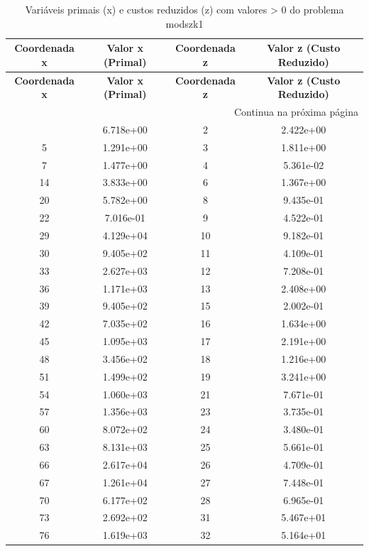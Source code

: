\documentclass[12pt]{article}
\begin{document}
\begin{longtable}{@{}cccc@{}}
\caption{Variáveis primais (x) e custos reduzidos (z) com valores > 0 do problema modszk1} \\
\toprule
\textbf{Coordenada x} & \textbf{Valor x (Primal)} & \textbf{Coordenada z} & \textbf{Valor z (Custo Reduzido)} \\
\midrule
\endfirsthead

\toprule
\textbf{Coordenada x} & \textbf{Valor x (Primal)} & \textbf{Coordenada z} & \textbf{Valor z (Custo Reduzido)} \\
\midrule
\endhead

\midrule \multicolumn{4}{r}{{Continua na próxima página}} \\ \midrule
\endfoot

\bottomrule
\endlastfoot
1 & 6.718e+00 & 2 & 2.422e+00 \\
5 & 1.291e+00 & 3 & 1.811e+00 \\
7 & 1.477e+00 & 4 & 5.361e-02 \\
14 & 3.833e+00 & 6 & 1.367e+00 \\
20 & 5.782e+00 & 8 & 9.435e-01 \\
22 & 7.016e-01 & 9 & 4.522e-01 \\
29 & 4.129e+04 & 10 & 9.182e-01 \\
30 & 9.405e+02 & 11 & 4.109e-01 \\
33 & 2.627e+03 & 12 & 7.208e-01 \\
36 & 1.171e+03 & 13 & 2.408e+00 \\
39 & 9.405e+02 & 15 & 2.002e-01 \\
42 & 7.035e+02 & 16 & 1.634e+00 \\
45 & 1.095e+03 & 17 & 2.191e+00 \\
48 & 3.456e+02 & 18 & 1.216e+00 \\
51 & 1.499e+02 & 19 & 3.241e+00 \\
54 & 1.060e+03 & 21 & 7.671e-01 \\
57 & 1.356e+03 & 23 & 3.735e-01 \\
60 & 8.072e+02 & 24 & 3.480e-01 \\
63 & 8.131e+03 & 25 & 5.661e-01 \\
66 & 2.617e+04 & 26 & 4.709e-01 \\
67 & 1.261e+04 & 27 & 7.448e-01 \\
70 & 6.177e+02 & 28 & 6.965e-01 \\
73 & 2.692e+02 & 31 & 5.467e+01 \\
76 & 1.619e+03 & 32 & 5.164e+01 \\

\end{longtable}
\end{document}
